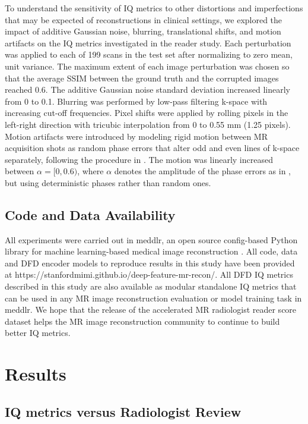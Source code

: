 \documentclass[AMA,STIX2COL,Linenumberson]{MRM}
\begin{document}
To understand the sensitivity of IQ metrics to other distortions and imperfections that may be expected of reconstructions in clinical settings, we explored the impact of additive Gaussian noise, blurring, translational shifts, and motion artifacts on the IQ metrics investigated in the reader study. Each perturbation was applied to each of 199 scans in the test set after normalizing to zero mean, unit variance. The maximum extent of each image perturbation was chosen so that the average SSIM between the ground truth and the corrupted images reached 0.6. The additive Gaussian noise standard deviation increased linearly from 0 to 0.1. Blurring was performed by low-pass filtering k-space with increasing cut-off frequencies. Pixel shifts were applied by rolling pixels in the left-right direction with tricubic interpolation from 0 to 0.55 mm (1.25 pixels). Motion artifacts were introduced by modeling rigid motion between MR acquisition shots as random phase errors that alter odd and even lines of k-space separately, following the procedure in \cite{desai2021vortex}. The motion was linearly increased between $\alpha = [0, 0.6)$, where $\alpha$ denotes the amplitude of the phase errors as in \cite{desai2021vortex}, but using deterministic phases rather than random ones.  

\subsection{Code and Data Availability}
All experiments were carried out in meddlr, an open source config-based Python library for machine learning-based medical image reconstruction \cite{desai2023noise2recon}. All code, data and DFD encoder models to reproduce results in this study have been provided at https://stanfordmimi.github.io/deep-feature-mr-recon/. All DFD IQ metrics described in this study are also available as modular standalone IQ metrics that can be used in any MR image reconstruction evaluation or model training task in meddlr. We hope that the release of the accelerated MR radiologist reader score dataset helps the MR image reconstruction community to continue to build better IQ metrics.

\section{Results}

\subsection{IQ metrics versus Radiologist Review}
\end{document}
